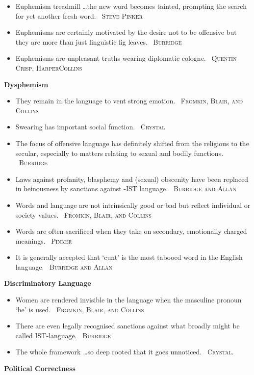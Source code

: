 \documentclass[10pt, a4paper]{article}
\newcommand{\heading}[1]{\textbf{#1}}
\newcommand{\linguist}[1]{\textemdash~\textsc{#1}}
\begin{document}
\begin{multicols}{2}
\begin{itemize}
    \item Euphemism treadmill \dots the new word becomes tainted, prompting the search for yet another fresh word. \linguist{Steve Pinker}
    \item Euphemisms are certainly motivated by the desire not to be offensive but they are more than just linguistic fig leaves. \linguist{Burridge}
    \item Euphemisms are unpleasant truths wearing diplomatic cologne. \linguist{Quentin Crisp, HarperCollins}
  \end{itemize}
  \heading{Dysphemism}
  \begin{itemize}
    \item They remain in the language to vent strong emotion. \linguist{Fromkin, Blair, and Collins}
    \item Swearing has important social function. \linguist{Crystal}
    \item The focus of offensive language has definitely shifted from the religious to the secular, especially to matters relating to sexual and bodily functions. \linguist{Burridge}
    \item Laws against profanity, blasphemy and (sexual) obscenity have been replaced in heinousness by sanctions against -IST language. \linguist{Burridge and Allan}
    \item Words and language are not intrinsically good or bad but reflect individual or society values. \linguist{Fromkin, Blair, and Collins}
    \item Words are often sacrificed when they take on secondary, emotionally charged meanings. \linguist{Pinker}
    \item It is generally accepted that `cunt' is the most tabooed word in the English language. \linguist{Burridge and Allan}
  \end{itemize}
  \heading{Discriminatory Language}
  \begin{itemize}
    \item Women are rendered invisible in the language when the masculine pronoun `he' is used. \linguist{Fromkin, Blair, and Collins}
    \item There are even legally recognised sanctions against what broadly might be called IST-language. \linguist{Burridge}
    \item The whole framework \dots so deep rooted that it goes unnoticed. \linguist{Crystal.}
  \end{itemize}
  \heading{Political Correctness}
  \begin{itemize}

\end{itemize}
\end{multicols}
\end{document}
